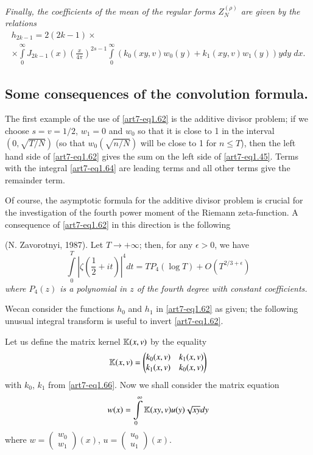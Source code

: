 \textit{Finally, the coefficients of the mean of the regular forms $Z^{(\rho)}_N$ are given by the relations}
\begin{gather*}
h_{2k-1} = 2 (2k-1) \times \\
\times \int\limits^\infty_0 J_{2k-1} (x) 
\left(\frac{x}{4\pi} \right)^{2s-1} \int\limits^{\infty}_0 (k_0 (xy, v) w_0 (y)+ k_1 (xy, v) w_1 (y) ) y dy \; dx. 
\end{gather*}

\subsection{Some consequences of the convolution formula.}\label{art7-subsec1.11}
The first example of the use of \eqref{art7-eq1.62} is the additive divisor problem; if we choose $s = v =1/2$, $w_1 =0$ and $w_0$ so that it is close to 1 in the interval $(0, \sqrt{T/N})$ (so that $w_0 (\sqrt{n/N})$ will be close to 1 for $n \leqslant T$), then the left hand side of \eqref{art7-eq1.62} gives the sum on the left side of \eqref{art7-eq1.45}. Terms with the integral \eqref{art7-eq1.64} are leading terms and all other terms give the remainder term. 

Of course, the asymptotic formula for the additive divisor problem is crucial for the investigation of the fourth power moment of the Riemann zeta-function. A consequence of \eqref{art7-eq1.62} in this direction is the following 

\begin{theorem*}
(N. Zavorotnyi, 1987). Let $T \to + \infty$; then, for any $\epsilon > 0$, we have
\begin{equation}
\int\limits^T_0 |\zeta(\frac{1}{2} + it)|^4 dt = TP_4 (\log T) + O(T^{2/3 + \epsilon}) \label{art7-eq1.67}
\end{equation}
\textit{where $P_4 (z)$ is a polynomial in $z$ of the fourth degree with constant coefficients.}
\end{theorem*}

We\pageoriginale can consider the functions $h_0$ and $h_1$ in \eqref{art7-eq1.62} as given; the following unusual integral transform is useful to invert \eqref{art7-eq1.62}.

Let us define the matrix kernel $\mathbb{K} (x,v)$ by the equality
\begin{equation}
\mathbb{K} (x,v) = 
\begin{pmatrix}
k_0 (x,v) & k_1 (x,v) \\
k_1(x,v) & k_0 (x,v)
\end{pmatrix} \label{art7-eq1.68}
\end{equation}
with $k_0$, $k_1$ from \eqref{art7-eq1.66}. Now we shall consider the matrix equation
\begin{equation}
w(x) = \int\limits^\infty_0 \mathbb{K} (xy, v) u (y) \sqrt{xy} dy \label{art7-eq1.69}
\end{equation}
where $w = \begin{pmatrix}
w_0 \\
w_1
\end{pmatrix} (x)$, $u = 
\begin{pmatrix}
u_0 \\
u_1
\end{pmatrix} (x)$. 

